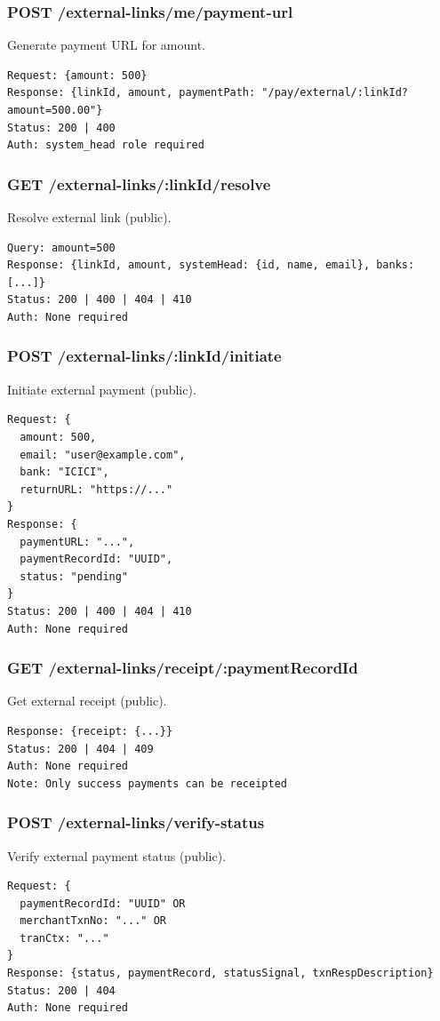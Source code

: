 \documentclass[12pt,a4paper]{article}
\begin{document}
\subsubsection{POST /external-links/me/payment-url}
Generate payment URL for amount.
\begin{lstlisting}
Request: {amount: 500}
Response: {linkId, amount, paymentPath: "/pay/external/:linkId?amount=500.00"}
Status: 200 | 400
Auth: system_head role required
\end{lstlisting}

\subsubsection{GET /external-links/:linkId/resolve}
Resolve external link (public).
\begin{lstlisting}
Query: amount=500
Response: {linkId, amount, systemHead: {id, name, email}, banks: [...]}
Status: 200 | 400 | 404 | 410
Auth: None required
\end{lstlisting}

\subsubsection{POST /external-links/:linkId/initiate}
Initiate external payment (public).
\begin{lstlisting}
Request: {
  amount: 500,
  email: "user@example.com",
  bank: "ICICI",
  returnURL: "https://..."
}
Response: {
  paymentURL: "...",
  paymentRecordId: "UUID",
  status: "pending"
}
Status: 200 | 400 | 404 | 410
Auth: None required
\end{lstlisting}

\subsubsection{GET /external-links/receipt/:paymentRecordId}
Get external receipt (public).
\begin{lstlisting}
Response: {receipt: {...}}
Status: 200 | 404 | 409
Auth: None required
Note: Only success payments can be receipted
\end{lstlisting}

\subsubsection{POST /external-links/verify-status}
Verify external payment status (public).
\begin{lstlisting}
Request: {
  paymentRecordId: "UUID" OR
  merchantTxnNo: "..." OR
  tranCtx: "..."
}
Response: {status, paymentRecord, statusSignal, txnRespDescription}
Status: 200 | 404
Auth: None required
\end{lstlisting}
\end{document}
